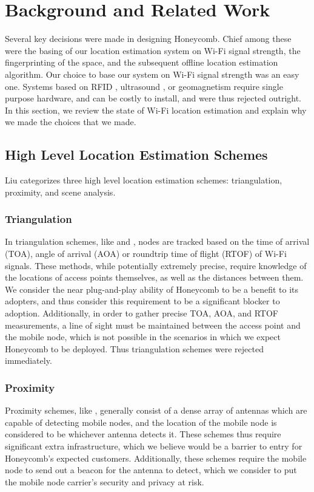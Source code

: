 \chapter{Background and Related Work}
\label{related}
%

Several key decisions were made in designing Honeycomb. Chief among these were the basing of our location estimation system on Wi-Fi signal strength, the fingerprinting of the space, and the subsequent offline location estimation algorithm. Our choice to base our system on Wi-Fi signal strength was an easy one. Systems based on RFID \cite{toplan2012rfid}, ultrasound \cite{priyantha2005cricket}, or geomagnetism \cite{chung2011indoor} require single purpose hardware, and can be costly to install, and were thus rejected outright. In this section, we review the state of Wi-Fi location estimation and explain why we made the choices that we made. 

\section{High Level Location Estimation Schemes}
%

Liu \cite{liu2007survey} categorizes three high level location estimation schemes: triangulation, proximity, and scene analysis. 

\subsection{Triangulation} In triangulation schemes, like \cite{xiong2013arraytrack} and \cite{xiong2012towards}, nodes are tracked based on the time of arrival (TOA), angle of arrival (AOA) or roundtrip time of flight (RTOF) of Wi-Fi signals. These methods, while potentially extremely precise, require knowledge of the locations of access points themselves, as well as the distances between them. We consider the near plug-and-play ability of Honeycomb to be a benefit to its adopters, and thus consider this requirement to be a significant blocker to adoption.  Additionally, in order to gather precise TOA, AOA, and RTOF measurements, a line of sight must be maintained between the access point and the mobile node, which is not possible in the scenarios in which we expect Honeycomb to be deployed. Thus triangulation schemes were rejected immediately. 

\subsection{Proximity} Proximity schemes, like \cite{blumrosen2010continuous}, generally consist of a dense array of antennas which are capable of detecting mobile nodes, and the location of the mobile node is considered to be whichever antenna detects it. These schemes thus require significant extra infrastructure, which we believe would be a barrier to entry for Honeycomb's expected customers. Additionally, these schemes require the mobile node to send out a beacon for the antenna to detect, which we consider to put the mobile node carrier's security and privacy at risk. 
	
